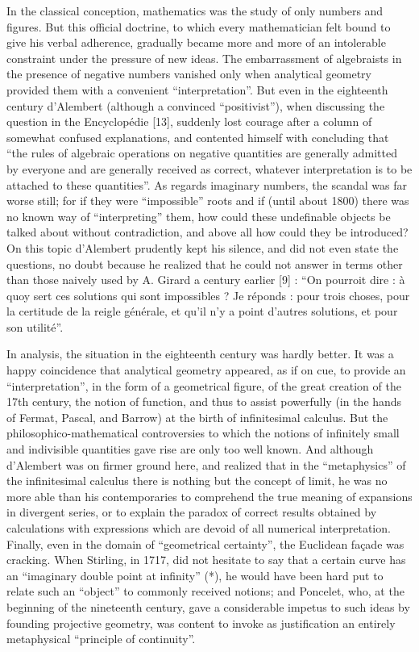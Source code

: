 In the classical conception, mathematics was the study of only numbers and figures. But this official doctrine, to which every mathematician felt bound to give his verbal adherence, gradually became more and more of an intolerable constraint under the pressure of new ideas. The embarrassment of algebraists in the presence of negative numbers vanished only when analytical geometry provided them with a convenient ``interpretation''. But even in the eighteenth century d'Alembert (although a convinced ``positivist''), when discussing the question in the Encyclopédie {[}13{]}, suddenly lost courage after a column of somewhat confused explanations, and contented himself with concluding that ``the rules of algebraic operations on negative quantities are generally admitted by everyone and are generally received as correct, whatever interpretation is to be attached to these quantities''. As regards imaginary numbers, the scandal was far worse still; for if they were ``impossible'' roots and if (until about 1800) there was no known way of ``interpreting'' them, how could these undefinable objects be talked about without contradiction, and above all how could they be introduced? On this topic d'Alembert prudently kept his silence, and did not even state the questions, no doubt because he realized that he could not answer in terms other than those naively used by A. Girard a century earlier {[}9{]} : ``On pourroit dire : à quoy sert ces solutions qui sont impossibles ? Je réponds : pour trois choses, pour la certitude de la reigle générale, et qu'il n'y a point d'autres solutions, et pour son utilité''.

In analysis, the situation in the eighteenth century was hardly better. It was a happy coincidence that analytical geometry appeared, as if on cue, to provide an ``interpretation'', in the form of a geometrical figure, of the great creation of the 17th century, the notion of function, and thus to assist powerfully (in the hands of Fermat, Pascal, and Barrow) at the birth of infinitesimal calculus. But the philosophico-mathematical controversies to which the notions of infinitely small and indivisible quantities gave rise are only too well known. And although d'Alembert was on firmer ground here, and realized that in the ``metaphysics'' of the infinitesimal calculus there is nothing but the concept of limit, he was no more able than his contemporaries to comprehend the true meaning of expansions in divergent series, or to explain the paradox of correct results obtained by calculations with expressions which are devoid of all numerical interpretation. Finally, even in the domain of ``geometrical certainty'', the Euclidean façade was cracking. When Stirling, in 1717, did not hesitate to say that a certain curve has an ``imaginary double point at infinity'' (*), he would have been hard put to relate such an ``object'' to commonly received notions; and Poncelet, who, at the beginning of the nineteenth century, gave a considerable impetus to such ideas by founding projective geometry, was content to invoke as justification an entirely metaphysical ``principle of continuity''.

